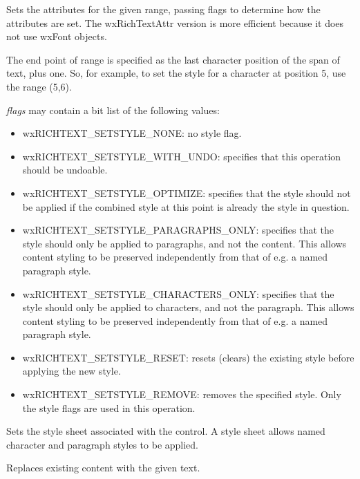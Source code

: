 Sets the attributes for the given range, passing flags to determine how the attributes are set. The wxRichTextAttr version is more efficient
because it does not use wxFont objects.

The end point of range is specified as the last character position of the span of text, plus one.
So, for example, to set the style for a character at position 5, use the range (5,6).

{\it flags} may contain a bit list of the following values:

\begin{itemize}\itemsep=0pt
\item wxRICHTEXT\_SETSTYLE\_NONE: no style flag.
\item wxRICHTEXT\_SETSTYLE\_WITH\_UNDO: specifies that this operation should be undoable.
\item wxRICHTEXT\_SETSTYLE\_OPTIMIZE: specifies that the style should not be applied if the
combined style at this point is already the style in question.
\item wxRICHTEXT\_SETSTYLE\_PARAGRAPHS\_ONLY: specifies that the style should only be applied to paragraphs,
and not the content. This allows content styling to be preserved independently from that of e.g. a named paragraph style.
\item wxRICHTEXT\_SETSTYLE\_CHARACTERS\_ONLY: specifies that the style should only be applied to characters,
and not the paragraph. This allows content styling to be preserved independently from that of e.g. a named paragraph style.
\item wxRICHTEXT\_SETSTYLE\_RESET: resets (clears) the existing style before applying the new style.
\item wxRICHTEXT\_SETSTYLE\_REMOVE: removes the specified style. Only the style flags are used in this operation.
\end{itemize}

\label{wxrichtextctrlsetstylesheet}


Sets the style sheet associated with the control. A style sheet allows named
character and paragraph styles to be applied.

\label{wxrichtextctrlsetvalue}


Replaces existing content with the given text.

